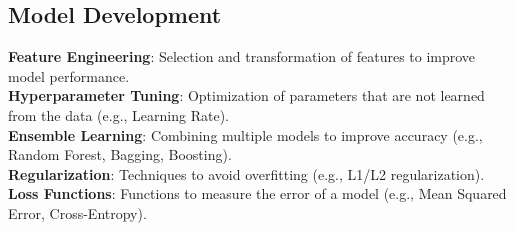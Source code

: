 \documentclass[english, threecolumn]{latex4ei/latex4ei_sheet}
\begin{document}
\begin{sectionbox}
\subsection{Model Development}
\textbf{Feature Engineering}: Selection and transformation of features to improve model performance.\\
\textbf{Hyperparameter Tuning}: Optimization of parameters that are not learned from the data (e.g., Learning Rate).\\
\textbf{Ensemble Learning}: Combining multiple models to improve accuracy (e.g., Random Forest, Bagging, Boosting).\\
\textbf{Regularization}: Techniques to avoid overfitting (e.g., L1/L2 regularization).\\
\textbf{Loss Functions}: Functions to measure the error of a model (e.g., Mean Squared Error, Cross-Entropy).
\end{sectionbox}
\end{document}
